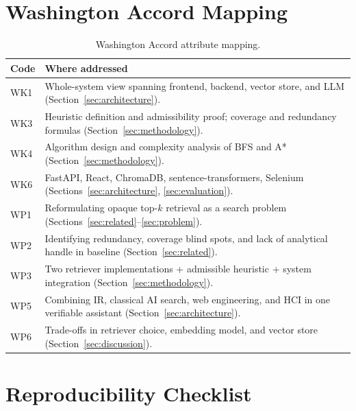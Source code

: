 \documentclass[conference]{IEEEtran}
\begin{document}
\appendix

\section{Washington Accord Mapping}

\begin{table}[h]
  \caption{Washington Accord attribute mapping.}
  \label{tab:wa}
  \centering
  \renewcommand{\arraystretch}{1.3}
  \begin{tabular}{p{0.7cm}p{6.5cm}}
    \toprule
    \textbf{Code} & \textbf{Where addressed}\\
    \midrule
    WK1 & Whole-system view spanning frontend, backend, vector store, and LLM
          (Section~\ref{sec:architecture}).\\
    WK3 & Heuristic definition and admissibility proof; coverage and redundancy
          formulas (Section~\ref{sec:methodology}).\\
    WK4 & Algorithm design and complexity analysis of BFS and A*
          (Section~\ref{sec:methodology}).\\
    WK6 & FastAPI, React, ChromaDB, sentence-transformers, Selenium
          (Sections~\ref{sec:architecture}, \ref{sec:evaluation}).\\
    WP1 & Reformulating opaque top-$k$ retrieval as a search problem
          (Sections~\ref{sec:related}--\ref{sec:problem}).\\
    WP2 & Identifying redundancy, coverage blind spots, and lack of analytical
          handle in baseline (Section~\ref{sec:related}).\\
    WP3 & Two retriever implementations + admissible heuristic + system
          integration (Section~\ref{sec:methodology}).\\
    WP5 & Combining IR, classical AI search, web engineering, and HCI in one
          verifiable assistant (Section~\ref{sec:architecture}).\\
    WP6 & Trade-offs in retriever choice, embedding model, and vector store
          (Section~\ref{sec:discussion}).\\
    \bottomrule
  \end{tabular}
\end{table}

\section{Reproducibility Checklist}
\end{document}
